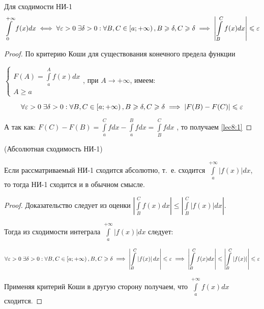 \documentclass[../../main.tex]{subfiles}
\begin{document}
\begin {thm}
Для сходимости НИ-1
 \begin{equation} \label{lec8:1}
  \int\limits_{0}^{+\infty} f(x)dx \iff \forall \varepsilon > 0 \;  \exists \delta > 
  0 : \forall B, C \in \left[a; +\infty\right), B \geqslant \delta, C \geqslant \delta 
  \implies \left| \int\limits_{B}^{C} f(x)dx \right| \leqslant \varepsilon
 \end{equation}
\end {thm}

\begin{proof}
По критерию Коши для существования конечного предела функции
 
$\begin{cases}
  F(A) = \displaystyle\int\limits_{a}^{A}f(x)dx\\
  A \geq a
 \end{cases}$, при $A \to +\infty$, имеем:
 
 \[\forall \varepsilon > 0 \; \exists \delta > 0 : \forall B, C \in \left[a; +\infty 
 \right), B \geqslant \delta, C \geqslant \delta \implies \left|F(B) - F(C) \right| \leqslant 
 \varepsilon\]
 
 А так как:
 $F(C) - F(B) = \displaystyle\int\limits_{a}^{C}fdx - 
 \displaystyle\int\limits_{a}^{B}fdx = \int\limits_{B}^{C}fdx$
 , то получаем \eqref{lec8:1}
\end{proof}

\begin{crl}
 (Абсолютная сходимость НИ-1)
 
 Если рассматриваемый НИ-1 сходится абсолютно, т.~е. сходится
 $\displaystyle\int\limits_{a}^{+\infty}|f(x)|dx$, то тогда НИ-1 сходится и в 
 обычном смысле.
 
 \begin{proof}
 Доказательство следует из оценки
$\left|\displaystyle\int\limits_{B}^{C}f(x)dx \right| \leq 
\left|\displaystyle\int\limits_{B}^{C}|f(x)|dx \right|$.

Тогда из сходимости интеграла $\displaystyle\int\limits_{a}^{+\infty}\left| 
f(x) \right| dx $ следует:

\[\forall \varepsilon > 0 \; \exists \delta > 0 : \forall B, C \in \left[a; +\infty 
\right), B, C \geqslant \delta \implies \left| \int\limits_{B}^{C} \left| f(x) 
\right| dx \right| \leqslant \varepsilon \implies \left| \int\limits_{B}^{C} f(x) dx 
\right| \leqslant \left|\int\limits_{B}^{C} \left| f(x) \right| \right| \leqslant \varepsilon\]

Применяя критерий Коши в другую сторону получаем, что 
$\displaystyle\int\limits_{a}^{+\infty}f(x)dx$ сходится.

 \end{proof}    
\end{crl}
\end{document}
